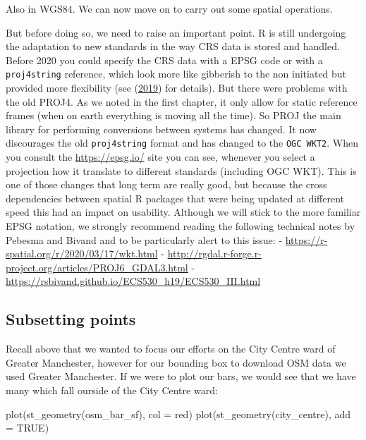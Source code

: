 \documentclass[
]{book}
\makeatletter
\newenvironment{Shaded}{\begin{snugshade}}{\end{snugshade}}
\newcommand{\AttributeTok}[1]{\textcolor[rgb]{0.61,0.61,0.61}{#1}}
\newcommand{\ConstantTok}[1]{\textcolor[rgb]{0,0,0}{#1}}
\newcommand{\FunctionTok}[1]{\textcolor[rgb]{0,0,0}{#1}}
\newcommand{\NormalTok}[1]{#1}
\newcommand{\StringTok}[1]{\textcolor[rgb]{0.5,0.5,0.5}{#1}}
\newenvironment{kframe}{%
\medskip{}
\setlength{\fboxsep}{.8em}
 \def\at@end@of@kframe{}%
 \ifinner\ifhmode%
  \def\at@end@of@kframe{\end{minipage}}%
  \begin{minipage}{\columnwidth}%
 \fi\fi%
 \def\FrameCommand##1{\hskip\@totalleftmargin \hskip-\fboxsep
 \colorbox{shadecolor}{##1}\hskip-\fboxsep
     \hskip-\linewidth \hskip-\@totalleftmargin \hskip\columnwidth}%
 \MakeFramed {\advance\hsize-\width
   \@totalleftmargin\z@ \linewidth\hsize
   \@setminipage}}%
 {\par\unskip\endMakeFramed%
 \at@end@of@kframe}
\renewenvironment{Shaded}{\begin{kframe}}{\end{kframe}}
\makeatother
\begin{document}
Also in WGS84. We can now move on to carry out some spatial operations.

But before doing so, we need to raise an important point. R is still undergoing the adaptation to new standards in the way CRS data is stored and handled. Before 2020 you could specify the CRS data with a EPSG code or with a \texttt{proj4string} reference, which look more like gibberish to the non initiated but provided more flexibility (see (\protect\hyperlink{ref-Lovelace_2019}{2019}) for details). But there were problems with the old PROJ4. As we noted in the first chapter, it only allow for static reference frames (when on earth everything is moving all the time). So PROJ the main library for performing conversions between systems has changed. It now discourages the old \texttt{proj4string} format and has changed to the \texttt{OGC\ WKT2}. When you consult the \url{https://epsg.io/} site you can see, whenever you select a projection how it translate to different standards (including OGC WKT). This is one of those changes that long term are really good, but because the cross dependencies between spatial R packages that were being updated at different speed this had an impact on usability. Although we will stick to the more familiar EPSG notation, we strongly recommend reading the following technical notes by Pebesma and Bivand and to be particularly alert to this issue:
- \url{https://r-spatial.org/r/2020/03/17/wkt.html}
- \url{http://rgdal.r-forge.r-project.org/articles/PROJ6_GDAL3.html}
- \url{https://rsbivand.github.io/ECS530_h19/ECS530_III.html}

\hypertarget{subsetting-points}{%
\subsection{Subsetting points}\label{subsetting-points}}

Recall above that we wanted to focus our efforts on the City Centre ward of Greater Manchester, however for our bounding box to download OSM data we used Greater Manchester. If we were to plot our bars, we would see that we have many which fall ourside of the City Centre ward:

\begin{Shaded}
\begin{Highlighting}[]
\FunctionTok{plot}\NormalTok{(}\FunctionTok{st\_geometry}\NormalTok{(osm\_bar\_sf), }\AttributeTok{col =} \StringTok{\textquotesingle{}red\textquotesingle{}}\NormalTok{)}
\FunctionTok{plot}\NormalTok{(}\FunctionTok{st\_geometry}\NormalTok{(city\_centre),  }\AttributeTok{add =} \ConstantTok{TRUE}\NormalTok{)}
\end{Highlighting}
\end{Shaded}
\end{document}
